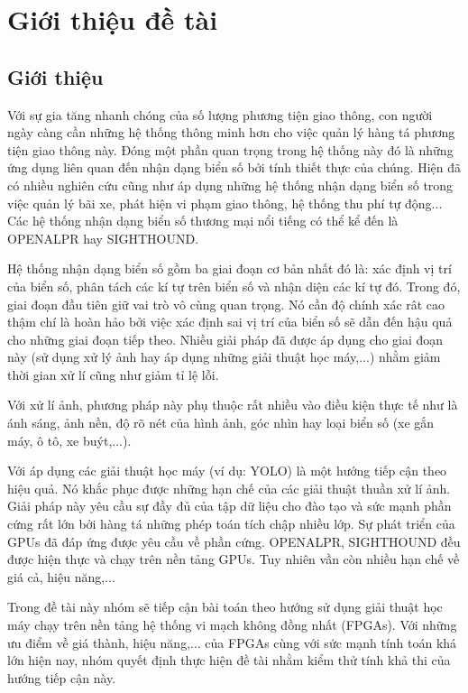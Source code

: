 \chapter{Giới thiệu đề tài}
\pagestyle{fancy}
    \section{Giới thiệu}
    Với sự gia tăng nhanh chóng của số lượng phương tiện giao thông, con người ngày càng cần những hệ thống thông minh hơn cho việc quản lý hàng tá phương tiện giao thông này. Đóng một phần quan trọng trong hệ thống này đó là những ứng dụng liên quan đến nhận dạng biển số bởi tính thiết thực của chúng. Hiện đã có nhiều nghiên cứu cũng như áp dụng những hệ thống nhận dạng biển số trong việc quản lý bãi xe, phát hiện vi phạm giao thông, hệ thống thu phí tự động... Các hệ thống nhận dạng biển số thương mại nổi tiếng có thể kể đến là OPENALPR hay SIGHTHOUND.

    Hệ thống nhận dạng biển số gồm ba giai đoạn cơ bản nhất đó là: xác định vị trí của biển số, phân tách các kí tự trên biển số và nhận diện các kí tự đó. Trong đó, giai đoạn đầu tiên giữ vai trò vô cùng quan trọng. Nó cần độ chính xác rât cao thậm chí là hoàn hảo bởi việc xác định sai vị trí của biển số sẽ dẫn đến hậu quả cho những giai đoạn tiếp theo. Nhiều giải pháp đã được áp dụng cho giai đoạn này (sử dụng xử lý ảnh hay áp dụng những giải thuật học máy,...) nhằm giảm thời gian xử lí cũng như giảm tỉ lệ lỗi.

    Với xử lí ảnh, phương pháp này phụ thuộc rất nhiều vào điều kiện thực tế như là ánh sáng, ảnh nền, độ rõ nét của hình ảnh, góc nhìn hay loại biển số (xe gắn máy, ô tô, xe buýt,...).

    Với áp dụng các giải thuật học máy (ví dụ: YOLO) là một hướng tiếp cận theo hiệu quả. Nó khắc phục được những hạn chế của các giải thuật thuần xử lí ảnh. Giải pháp này yêu cầu sự đầy đủ của tập dữ liệu cho đào tạo và sức mạnh phần cứng rất lớn bởi hàng tá những phép toán tích chập nhiều lớp. Sự phát triển của GPUs đã đáp ứng được yêu cầu về phần cứng. OPENALPR, SIGHTHOUND đều được hiện thực và chạy trên nền tảng GPUs. Tuy nhiên vần còn nhiều hạn chế về giá cả, hiệu năng,...

    Trong đề tài này nhóm sẽ tiếp cận bài toán theo hướng sử dụng giải thuật học máy chạy trên nền tảng hệ thống vi mạch không đồng nhất (FPGAs). Với những ưu điểm về giá thành, hiệu năng,... của FPGAs cùng với sức mạnh tính toán khá lớn hiện nay, nhóm quyết định thực hiện đề tài nhằm kiểm thử tính khả thi của hướng tiếp cận này.
